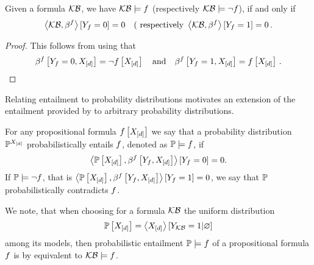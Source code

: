 \begin{theorem}
    Given a formula $\mathcal{KB}$, we have $\mathcal{KB}\models f$ (respectively $\mathcal{KB}\models\lnot f$), if and only if
    \begin{align*}
        \left\langle \mathcal{KB},\beta^{f}\right\rangle \left[ Y_{f}=0 \right] = 0
        \quad \text{( respectively }
        \left\langle \mathcal{KB},\beta^{f}\right\rangle \left[ Y_{f}=1 \right] = 0 \, .
    \end{align*}
\end{theorem}
\begin{proof}
    This follows from  using that
    \begin{align*}
        \beta^{f}\left[Y_{f}=0,X_{[d]}\right] = \lnot f\left[X_{[d]}\right] \quad \text{and} \quad \beta^{f}\left[Y_{f}=1,X_{[d]}\right] = f\left[X_{[d]}\right] \, .
    \end{align*}
\end{proof}


%
Relating entailment to probability distributions motivates an extension of the entailment provided by  to arbitrary probability distributions.

\begin{definition}
    \label{def:probEntailment}
    For any propositional formula $f\left[X_{[d]}\right]$ we say that a probability distribution $\mathbb{P}^{X_{[d]}}$ probabilistically entails $f$, denoted as $\mathbb{P}\models f$, if
    \begin{align*}
        \left\langle \mathbb{P}\left[X_{[d]}\right],\beta^{f}\left[Y_{f},X_{[d]}\right]\right\rangle \left[ Y_{f}=0 \right] = 0 .
    \end{align*}
    If $\mathbb{P}\models\lnot f$, that is $\left\langle \mathbb{P}\left[X_{[d]}\right],\beta^{f}\left[Y_{f},X_{[d]}\right]\right\rangle \left[ Y_{f}=1 \right] = 0$, we say that $\mathbb{P}$ probabilistically contradicts $f$.
\end{definition}

%
We note, that when choosing for a formula $\mathcal{KB}$ the uniform distribution
\begin{align*}
    \mathbb{P}\left[X_{[d]}\right]=\left\langle X_{[d]}\right\rangle \left[ Y_{\mathcal{KB}}=1 | \varnothing \right]
\end{align*}
among its models, then probabilistic entailment $\mathbb{P}\models f$ of a propositional formula $f$ is by  equivalent to $\mathcal{KB}\models f$.

